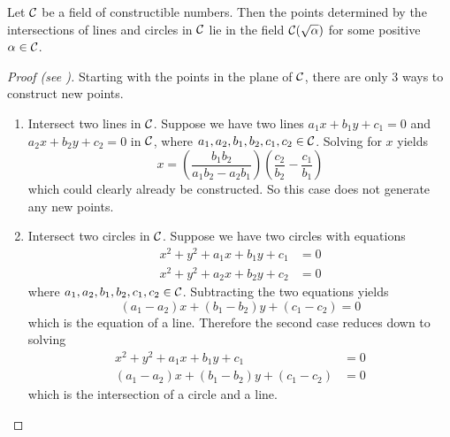 \begin{lemma}
    Let $\mathcal{C}$ be a field of constructible numbers. Then the points determined by the intersections of lines and circles in $\mathcal{C}$ lie in the field $\mathcal{C}(\sqrt{\alpha})$ for some positive $\alpha \in \mathcal{C}$.
\end{lemma}
\begin{proof}[Proof (see {\cite[pp.~272-273]{judson_beezer_2022}})]
    Starting with the points in the plane of $\mathcal{C}$, there are only 3 ways to construct new points.
    \begin{enumerate}
        \item Intersect two lines in $\mathcal{C}$. Suppose we have two lines $a_1x + b_1y + c_1 = 0$ and $a_2x + b_2y + c_2 = 0$ in $\mathcal{C}$, where $a_1,a_2,b_1,b_2,c_1,c_2 \in \mathcal{C}$. Solving for $x$ yields
        \[
            x = \left(\frac{b_1b_2}{a_1b_2-a_2b_1}\right)\left(\frac{c_2}{b_2}-\frac{c_1}{b_1}\right)
        \]
        which could clearly already be constructed. So this case does not generate any new points.

        \item Intersect two circles in $\mathcal{C}$. Suppose we have two circles with equations
        \begin{align*}
            x^2 + y^2 + a_1x + b_1y + c_1 &= 0\\
            x^2 + y^2 + a_2x + b_2y + c_2 &= 0
        \end{align*}
        where $a_1,a_2,b_1,b_2,c_1,c_2 \in \mathcal{C}$. Subtracting the two equations yields
        \[
            (a_1-a_2)x + (b_1-b_2)y + (c_1-c_2) = 0
        \]
        which is the equation of a line. Therefore the second case reduces down to solving
        \begin{align*}
            x^2 + y^2 + a_1x + b_1y + c_1 &= 0\\
            (a_1-a_2)x + (b_1-b_2)y + (c_1-c_2) &= 0
        \end{align*}
        which is the intersection of a circle and a line.


\end{enumerate}
\end{proof}
